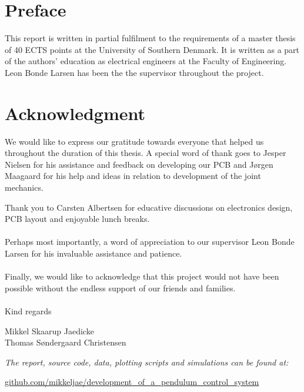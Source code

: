 
\section*{Preface}
This report is written in partial fulfilment to the requirements of a master thesis of 40 ECTS points at the University of Southern Denmark.
It is written as a part of the authors' education as electrical engineers at the Faculty of Engineering.
\\
Leon Bonde Larsen has been the the supervisor throughout the project.

\section*{Acknowledgment}

We would like to express our gratitude towards everyone that helped us throughout the duration of this thesis.
A special word of thank goes to Jesper Nielsen for his assistance and feedback on developing our PCB and Jørgen Maagaard for his help and ideas in relation to development of the joint mechanics. 

Thank you to Carsten Albertsen for educative discussions on electronics design, PCB layout and enjoyable lunch breaks. 
\\~\\
Perhaps most importantly, a word of appreciation to our supervisor Leon Bonde Larsen for his invaluable assistance and patience.
\\~\\
Finally, we would like to acknowledge that this project would not have been possible without the endless support of our friends and families.
\\~\\
Kind regards 
\vspace{0.5cm}
\begin{center}
	\begin{minipage}[t]{.49\textwidth}\large
		\begin{center}
		Mikkel Skaarup Jaedicke\\
		Thomas Søndergaard Christensen
		\end{center} 
	\end{minipage}
\end{center}

\vfill
  \begin{center}
    \textsl{The report, source code, data, plotting scripts and simulations can be found at:}  
    \end{center}
    \vspace{-5pt}
    \begin{center}
	\renewcommand{\UrlFont}{\color{black}\normalsize\tt}
    \url{github.com/mikkeljae/development_of_a_pendulum_control_system}
   \end{center}
\newpage

